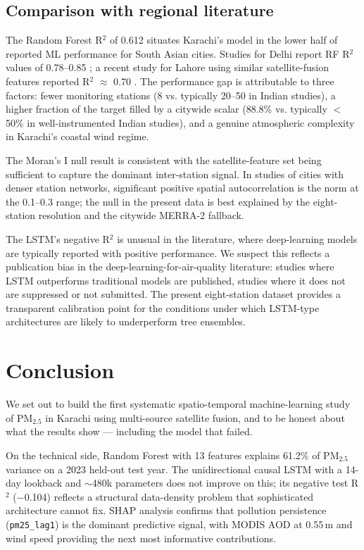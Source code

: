 \documentclass{iopjournal}
\begin{document}
\subsection{Comparison with regional literature}

The Random Forest R$^{2}$ of 0.612 situates Karachi's model in the
lower half of reported ML performance for South Asian cities.
Studies for Delhi report RF R$^{2}$ values of 0.78--0.85
\cite{Sayeed2021, Brokamp2018}; a recent study for Lahore using
similar satellite-fusion features reported R$^{2}$ $\approx$ 0.70
\cite{Liang2020}. The performance gap is attributable to three
factors: fewer monitoring stations (8 vs. typically 20--50 in
Indian studies), a higher fraction of the target filled by a
citywide scalar (88.8\% vs. typically $<$50\% in well-instrumented
Indian studies), and a genuine atmospheric complexity in
Karachi's coastal wind regime.

The Moran's I null result is consistent with the satellite-feature
set being sufficient to capture the dominant inter-station signal.
In studies of cities with denser station networks, significant
positive spatial autocorrelation is the norm at the 0.1--0.3
range; the null in the present data is best explained by the
eight-station resolution and the citywide MERRA-2 fallback.

The LSTM's negative R$^{2}$ is unusual in the literature, where
deep-learning models are typically reported with positive
performance. We suspect this reflects a publication bias in the
deep-learning-for-air-quality literature: studies where LSTM
outperforms traditional models are published, studies where it
does not are suppressed or not submitted. The present
eight-station dataset provides a transparent calibration point
for the conditions under which LSTM-type architectures are
likely to underperform tree ensembles.

\section{Conclusion}
\label{sec:concl}

We set out to build the first systematic spatio-temporal
machine-learning study of PM$_{2.5}$ in Karachi using
multi-source satellite fusion, and to be honest about what the
results show --- including the model that failed.

On the technical side, Random Forest with 13 features explains
61.2\% of PM$_{2.5}$ variance on a 2023 held-out test year. The
unidirectional causal LSTM with a 14-day lookback and $\sim$480k
parameters does not improve on this; its negative test R$^{2}$
($-$0.104) reflects a structural data-density problem that
sophisticated architecture cannot fix. SHAP analysis confirms
that pollution persistence (\texttt{pm25\_lag1}) is the dominant
predictive signal, with MODIS AOD at 0.55\,\textmu m and wind
speed providing the next most informative contributions.
\end{document}
